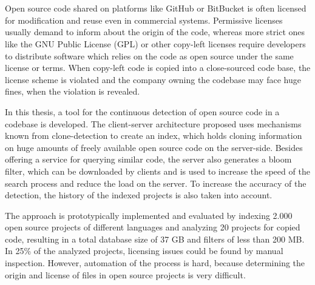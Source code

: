 \chapter{\abstractname}
Open source code shared on platforms like GitHub or BitBucket is often licensed for modification and reuse even in commercial systems.
Permissive licenses usually demand to inform about the origin of the code, whereas more strict ones like the GNU Public License (GPL) or other copy-left licenses require developers to distribute software which relies on the code as open source under the same license or terms.
When copy-left code is copied into a close-sourced code base, the license scheme is violated and the company owning the codebase may face huge fines, when the violation is revealed.

In this thesis, a tool for the continuous detection of open source code in a codebase is developed.
The client-server architecture proposed uses mechanisms known from clone-detection to create an index, which holds cloning information on huge amounts of freely available open source code on the server-side.
Besides offering a service for querying similar code, the server also generates a bloom filter, which can be downloaded by clients and is used to increase the speed of the search process and reduce the load on the server.
To increase the accuracy of the detection, the history of the indexed projects is also taken into account.

The approach is prototypically implemented and evaluated by indexing 2.000 open source projects of different languages and analyzing 20 projects for copied code, resulting in a total database size of 37 GB and filters of less than 200 MB.
In 25\% of the analyzed projects, licensing issues could be found by manual inspection.
However, automation of the process is hard, because determining the origin and license of files in open source projects is very difficult.